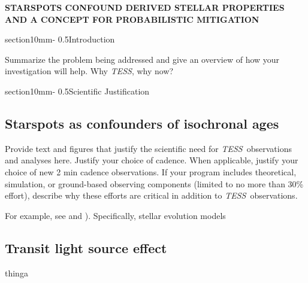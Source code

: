 \documentclass[letterpaper,11pt]{article}
\makeatletter
\renewcommand{\section}{\@startsection%
{section}{1}{0mm}{-\baselineskip}%
{0.5\baselineskip}{\normalfont\Large\bfseries}}%
\newcommand{\tess}{{\it TESS}}
\makeatother
\begin{document}
\pagestyle{plain}




\begin{center}
\bfseries\uppercase{%
Starspots confound derived stellar properties and a concept for probabilistic mitigation
}
\end{center}




\section{Introduction}

Summarize the problem being addressed and give an overview of how your investigation will help.
Why \tess, why now?


\section{Scientific Justification}



\subsection{Starspots as confounders of isochronal ages}
Provide text and figures that justify the scientific need for \tess\ observations and analyses here.
Justify your choice of cadence. When applicable, justify your choice of new 2 min cadence observations.
If your program includes theoretical, simulation, or ground-based observing components (limited to no
more than 30\% effort), describe why these efforts are critical in addition to \tess\ observations.

For example, see \cite{2015ApJ...807..174S} and \cite{2015arXiv150706460F}).  Specifically, stellar evolution models



\subsection{Transit light source effect}
thinga
\end{document}
